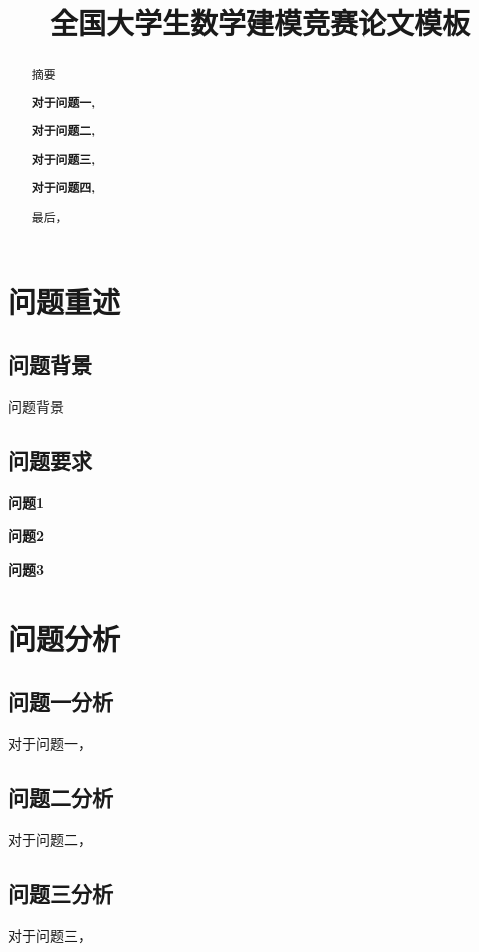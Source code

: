 \documentclass{cumcmthesis}
\title{全国大学生数学建模竞赛论文模板}  %
\begin{document}
\maketitle

\begin{abstract}
摘要

\textbf{对于问题一,}

\textbf{对于问题二,}

\textbf{对于问题三,}

\textbf{对于问题四,}

最后，



\end{abstract}

\section{问题重述}
\subsection{问题背景}
问题背景


\subsection{问题要求}

\textbf{问题1}  

\textbf{问题2}  

\textbf{问题3} 


\section{问题分析}
\subsection{问题一分析}
对于问题一，

\subsection{问题二分析}	
对于问题二，

\subsection{问题三分析}
对于问题三，
\end{document}
